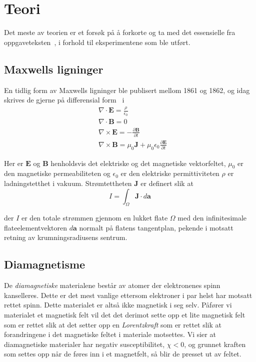 \documentclass[a4paper,11pt, twocolumn]{article}
\begin{document}
\section{Teori}
Det meste av teorien er et forsøk på å forkorte og ta med det essensielle fra oppgaveteksten~\cite{oppgavesett}, i forhold til eksperimentene som ble utført.
\subsection{Maxwells ligninger}
En tidlig form av Maxwells ligninger ble publisert mellom 1861 og 1862, og idag skrives de gjerne på differensial form~\cite[kap. 9.3.3]{griffithsED}
i
\begin{align}
	&\nabla\cdot\mathbf{E}= \frac{\rho}{\epsilon_0}
	\label{eq:max1}\\
	&\nabla\cdot\mathbf{B} = 0
	\label{eq:max2}\\
	&\nabla\times\mathbf{E} = -\frac{\partial \mathbf{B}}{\partial t}
	\label{eq:max3}\\
	&\nabla\times\mathbf{B} = \mu_0\mathbf{J}+\mu_0\epsilon_0\frac{\partial\mathbf{E}}{\partial t}
	\label{eq:max4}
\end{align}

Her er $\mathbf{E}$ og $\mathbf{B}$ henholdsvis det elektriske og det magnetiske vektorfeltet, $\mu_0$ er den magnetiske permeabiliteten og $\epsilon_0$ er den elektriske permittiviteten $\rho$ er ladningstetthet i vakuum. Strømtettheten $\mathbf{J}$ er definert slik at 
\begin{equation}
	I = \int_\Omega \mathbf{J}\cdot d\mathbf{a}
	\label{eq:currentDensity}
\end{equation}

der $I$ er den totale strømmen gjennom en lukket flate $\Omega$ med den infinitesimale flateelementvektoren $d\mathbf{a}$ normalt på flatens tangentplan, pekende i motsatt retning av krumningsradiusens sentrum. 
\subsection{Diamagnetisme}
De \textit{diamagnetiske} materialene består av atomer der elektronenes spinn kanselleres. Dette er det mest vanlige ettersom elektroner i par helst har motsatt rettet spinn. Dette materialet er altså ikke magnetisk i seg selv. Påfører vi materialet et magnetisk felt vil det det derimot sette opp et lite magnetisk felt som er rettet slik at det setter opp en \textit{Lorentzkraft} som er rettet slik at forandringene i det magnetiske feltet i materiale motsettes. Vi sier at diamagnetiske materialer har negativ susceptibilitet, $\chi <0$, og grunnet kraften som settes opp når de føres inn i et magnetfelt, så blir de presset ut av feltet.
\end{document}
